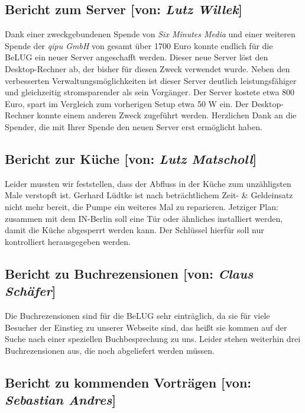 \documentclass[11pt,a4paper,ngerman]{article}
\begin{document}
  \subsection{Bericht zum Server [von: 
\textcolor{hellgrau.60}{\textsl{Lutz Willek}}]}

Dank einer zweckgebundenen Spende von \emph{Six Minutes Media} und einer 
weiteren Spende der \emph{qipu GmbH} von gesamt über 1700 Euro konnte endlich 
für die BeLUG ein neuer Server angeschafft werden. Dieser neue Server löst den 
Desktop-Rechner ab, der bisher für diesen Zweck verwendet wurde. Neben den 
verbesserten Verwaltungsmöglichkeiten ist dieser Server deutlich 
leistungsfähiger und gleichzeitig stromsparender als sein Vorgänger. Der Server 
kostete etwa 800 Euro, spart im Vergleich zum vorherigen Setup etwa 50 W ein. 
Der Desktop-Rechner konnte einem anderen Zweck zugeführt werden. Herzlichen 
Dank an die Spender, die mit Ihrer Spende den neuen Server erst ermöglicht 
haben.


  \subsection{Bericht zur Küche [von: 
\textcolor{hellgrau.60}{\textsl{Lutz Matscholl}}]}

Leider mussten wir feststellen, dass der Abfluss in der Küche zum unzähligsten 
Male verstopft ist. Gerhard Lüdtke ist nach beträchtlichem Zeit- \& Geldeinsatz 
nicht mehr bereit, die Pumpe ein weiteres Mal zu reparieren. Jetziger Plan: 
zusammen mit dem IN-Berlin soll eine Tür oder ähnliches installiert werden, 
damit die Küche abgesperrt werden kann. Der Schlüssel hierfür soll nur 
kontrolliert herausgegeben werden.


  \subsection{Bericht zu Buchrezensionen [von: 
\textcolor{hellgrau.60}{\textsl{Claus Schäfer}}]}

Die Buchrezensionen sind für die BeLUG sehr einträglich, da sie für viele 
Besucher der Einstieg zu unserer Webseite sind, das heißt sie kommen auf der 
Suche nach einer speziellen Buchbesprechung zu uns. Leider stehen weiterhin 
drei Buchrezensionen aus, die noch abgeliefert werden müssen.


  \subsection{Bericht zu kommenden Vorträgen [von: 
\textcolor{hellgrau.60}{\textsl{Sebastian Andres}}]}
\end{document}
